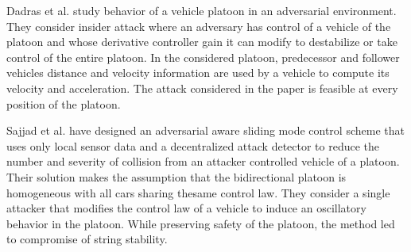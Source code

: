 Dadras et al. \cite{DGRS15} study behavior of a vehicle platoon in an adversarial environment. They consider insider attack where an adversary has control of a vehicle of the platoon and whose derivative controller gain it can modify to destabilize or take control of the entire platoon. In the considered platoon, predecessor and follower vehicles distance and velocity information are used by a vehicle to compute its velocity and acceleration. The attack considered in the paper is feasible at every position of the platoon. 

Sajjad et al. \cite{SSDSG15} have designed an adversarial aware sliding mode control scheme that uses only local sensor data and a decentralized attack detector to reduce the number and severity of collision from an attacker controlled vehicle of a platoon. Their solution makes the assumption that the bidirectional platoon is homogeneous with all cars sharing thesame control law. They consider a single attacker that modifies the control law of a vehicle to induce an oscillatory behavior in the platoon. While preserving safety of the platoon, the method led to compromise of string stability.     

